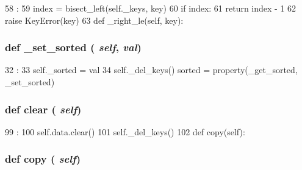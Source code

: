 \begin{DoxyCode}
58                             :
59         index = bisect_left(self._keys, key)
60         if index:
61             return index - 1
62         raise KeyError(key)
63 
    def _right_le(self, key):
\end{DoxyCode}
\hypertarget{classm5_1_1util_1_1sorteddict_1_1SortedDict_aeeede65b4f06d4e64bae6ce039707ec6}{
\subsubsection[{\_\-set\_\-sorted}]{\setlength{\rightskip}{0pt plus 5cm}def \_\-set\_\-sorted ( {\em self}, \/   {\em val})}}
\label{classm5_1_1util_1_1sorteddict_1_1SortedDict_aeeede65b4f06d4e64bae6ce039707ec6}



\begin{DoxyCode}
32                               :
33         self._sorted = val
34         self._del_keys()
    sorted = property(_get_sorted, _set_sorted)
\end{DoxyCode}
\hypertarget{classm5_1_1util_1_1sorteddict_1_1SortedDict_a07b95aa63e9e2d286ef0aa83d5bb34b2}{
\subsubsection[{clear}]{\setlength{\rightskip}{0pt plus 5cm}def clear ( {\em self})}}
\label{classm5_1_1util_1_1sorteddict_1_1SortedDict_a07b95aa63e9e2d286ef0aa83d5bb34b2}



\begin{DoxyCode}
99                    :
100         self.data.clear()
101         self._del_keys()
102 
    def copy(self):
\end{DoxyCode}
\hypertarget{classm5_1_1util_1_1sorteddict_1_1SortedDict_a2fa43c22b5f7af93ba8b4a56871f006a}{
\subsubsection[{copy}]{\setlength{\rightskip}{0pt plus 5cm}def copy ( {\em self})}}
\label{classm5_1_1util_1_1sorteddict_1_1SortedDict_a2fa43c22b5f7af93ba8b4a56871f006a}



